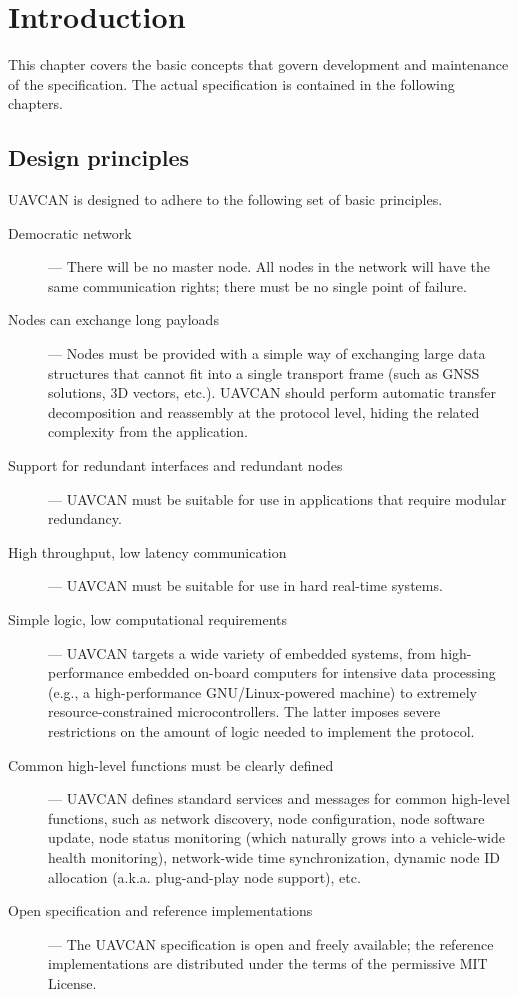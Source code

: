 \chapter{Introduction}\label{sec:introduction}

This chapter covers the basic concepts that govern development and maintenance of the specification.
The actual specification is contained in the following chapters.

\section{Design principles}

UAVCAN is designed to adhere to the following set of basic principles.

\begin{description}
    \item[Democratic network] --- There will be no master node.
    All nodes in the network will have the same communication rights; there must be no single point of failure.

    \item[Nodes can exchange long payloads] --- Nodes must be provided with a simple way of exchanging large
    data structures that cannot fit into a single transport frame (such as GNSS solutions, 3D vectors, etc.).
    UAVCAN should perform automatic transfer decomposition and reassembly at the protocol level,
    hiding the related complexity from the application.

    \item[Support for redundant interfaces and redundant nodes] --- UAVCAN must be suitable for use in
    applications that require modular redundancy.

    \item[High throughput, low latency communication] --- UAVCAN must be suitable for use in
    hard real-time systems.

    \item[Simple logic, low computational requirements] --- UAVCAN targets a wide variety of embedded systems,
    from high-performance embedded on-board computers for intensive data processing
    (e.g., a high-performance GNU/Linux-powered machine) to extremely resource-constrained microcontrollers.
    The latter imposes severe restrictions on the amount of logic needed to implement the protocol.

    \item[Common high-level functions must be clearly defined] --- UAVCAN defines standard services
    and messages for common high-level functions, such as network discovery, node configuration,
    node software update, node status monitoring (which naturally grows into a vehicle-wide health monitoring),
    network-wide time synchronization, dynamic node ID allocation (a.k.a. plug-and-play node support), etc.

    \item[Open specification and reference implementations] --- The UAVCAN specification is open and
    freely available; the reference implementations are distributed under the terms of the permissive MIT License.
\end{description}

